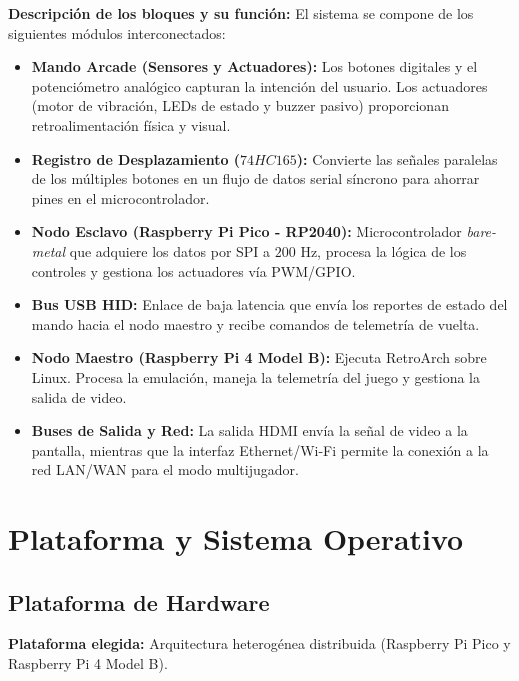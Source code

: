 \documentclass[conference]{IEEEtran}
\begin{document}
\textbf{Descripción de los bloques y su función:} 
El sistema se compone de los siguientes módulos interconectados:
\begin{itemize}
    \item \textbf{Mando Arcade (Sensores y Actuadores):} Los botones digitales y el potenciómetro analógico capturan la intención del usuario. Los actuadores (motor de vibración, LEDs de estado y buzzer pasivo) proporcionan retroalimentación física y visual.
    \item \textbf{Registro de Desplazamiento ($74HC165$):} Convierte las señales paralelas de los múltiples botones en un flujo de datos serial síncrono para ahorrar pines en el microcontrolador.
    \item \textbf{Nodo Esclavo (Raspberry Pi Pico - RP2040):} Microcontrolador \textit{bare-metal} que adquiere los datos por SPI a $200\text{ Hz}$, procesa la lógica de los controles y gestiona los actuadores vía PWM/GPIO.
    \item \textbf{Bus USB HID:} Enlace de baja latencia que envía los reportes de estado del mando hacia el nodo maestro y recibe comandos de telemetría de vuelta.
    \item \textbf{Nodo Maestro (Raspberry Pi 4 Model B):} Ejecuta RetroArch sobre Linux. Procesa la emulación, maneja la telemetría del juego y gestiona la salida de video.
    \item \textbf{Buses de Salida y Red:} La salida HDMI envía la señal de video a la pantalla, mientras que la interfaz Ethernet/Wi-Fi permite la conexión a la red LAN/WAN para el modo multijugador.
\end{itemize}

\section{Plataforma y Sistema Operativo}

\subsection{Plataforma de Hardware}

\textbf{Plataforma elegida:} Arquitectura heterogénea distribuida (Raspberry Pi Pico y Raspberry Pi 4 Model B).
\end{document}
